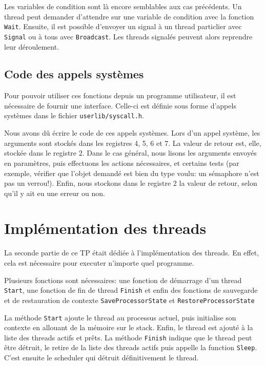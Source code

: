 \documentclass{article}
\def\file#1{\texttt{#1}}
\def\fun#1{\texttt{#1}}
\begin{document}
  Les variables de condition sont là encore semblables aux cas précédents. Un thread peut demander d'attendre sur une variable de condition avec la fonction \fun{Wait}. Ensuite, il est possible d'envoyer un signal à un thread particlier avec \fun{Signal} ou à tous avec \fun{Broadcast}. Les threads signalés peuvent alors reprendre leur déroulement.

\subsection{Code des appels systèmes}

  Pour pouvoir utiliser ces fonctions depuis un programme utilisateur, il est nécessaire de fournir une interface. Celle-ci est définie sous forme d'appels systèmes dans le fichier \file{userlib/syscall.h}.

  Nous avons dû écrire le code de ces appels systèmes. Lors d'un appel système, les arguments sont stockés dans les registres 4, 5, 6 et 7. La valeur de retour est, elle, stockée dans le registre 2.
  Dans le cas général, nous lisons les arguments envoyés en paramètres, puis effectuons les actions nécessaires, et certains tests (par exemple, vérifier que l'objet demandé est bien du type voulu: un sémaphore n'est pas un verrou!). Enfin, nous stockons dans le registre 2 la valeur de retour, selon qu'il y ait eu une erreur ou non.

\section{Implémentation des threads}

La seconde partie de ce TP était dédiée à l'implémentation des threads. En effet, cela est nécessaire pour executer n'importe quel programme.

Plusieurs fonctions sont nécessaires: une fonction de démarrage d'un thread \fun{Start}, une fonction de fin de thread \fun{Finish} et enfin des fonctions de sauvegarde et de restauration de contexte \fun{SaveProcessorState} et \fun{RestoreProcessorState}

La méthode \fun{Start} ajoute le thread au processus actuel, puis initialise son contexte en allouant de la mémoire sur le stack. Enfin, le thread est ajouté à la liste des threads actifs et prêts.
La méthode \fun{Finish} indique que le thread peut être détruit, le retire de la liste des threads actifs puis appelle la function \fun{Sleep}. C'est ensuite le scheduler qui détruit définitivement le thread.
\end{document}
